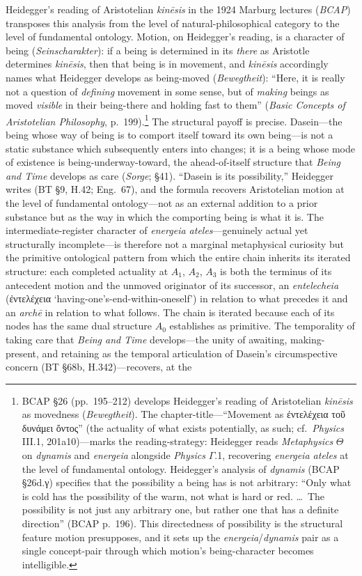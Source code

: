 \documentclass{article}
\newcommand{\gk}[1]{{\greekfont #1}}
\begin{document}
Heidegger's reading of Aristotelian \textit{kinēsis} in the 1924 Marburg lectures (\textit{BCAP}) transposes this analysis from the level of natural-philosophical category to the level of fundamental ontology. Motion, on Heidegger's reading, is a character of being (\textit{Seinscharakter}): if a being is determined in its \textit{there} as Aristotle determines \textit{kinēsis}, then that being is in movement, and \textit{kinēsis} accordingly names what Heidegger develops as being-moved (\textit{Bewegtheit}): ``Here, it is really not a question of \textit{defining} movement in some sense, but of \textit{making} beings as moved \textit{visible} in their being-there and holding fast to them'' (\textit{Basic Concepts of Aristotelian Philosophy}, p.~199).\footnote{BCAP §26 (pp.~195--212) develops Heidegger's reading of Aristotelian \textit{kinēsis} as movedness (\textit{Bewegtheit}). The chapter-title---``Movement as \gk{ἐντελέχεια τοῦ δυνάμει ὄντος}'' (the actuality of what exists potentially, as such; cf.~\textit{Physics} III.1, 201a10)---marks the reading-strategy: Heidegger reads \textit{Metaphysics} $\Theta$ on \textit{dynamis} and \textit{energeia} alongside \textit{Physics} $\Gamma$.1, recovering \textit{energeia ateles} at the level of fundamental ontology. Heidegger's analysis of \textit{dynamis} (BCAP §26d.γ) specifies that the possibility a being has is not arbitrary: ``Only what is cold has the possibility of the warm, not what is hard or red. \ldots\ The possibility is not just any arbitrary one, but rather one that has a definite direction'' (BCAP p.~196). This directedness of possibility is the structural feature motion presupposes, and it sets up the \textit{energeia}/\textit{dynamis} pair as a single concept-pair through which motion's being-character becomes intelligible.} The structural payoff is precise. Dasein---the being whose way of being is to comport itself toward its own being---is not a static substance which subsequently enters into changes; it is a being whose mode of existence is being-underway-toward, the ahead-of-itself structure that \textit{Being and Time} develops as care (\textit{Sorge}; \S 41). ``Dasein is its possibility,'' Heidegger writes (BT \S 9, H.42; Eng.~67), and the formula recovers Aristotelian motion at the level of fundamental ontology---not as an external addition to a prior substance but as the way in which the comporting being is what it is. The intermediate-register character of \textit{energeia ateles}---genuinely actual yet structurally incomplete---is therefore not a marginal metaphysical curiosity but the primitive ontological pattern from which the entire chain inherits its iterated structure: each completed actuality at $A_1$, $A_2$, $A_3$ is both the terminus of its antecedent motion and the unmoved originator of its successor, an \textit{entelecheia} (\gk{ἐντελέχεια} `having-one's-end-within-oneself') in relation to what precedes it and an \textit{archē} in relation to what follows. The chain is iterated because each of its nodes has the same dual structure $A_0$ establishes as primitive. The temporality of taking care that \textit{Being and Time} develops---the unity of awaiting, making-present, and retaining as the temporal articulation of Dasein's circumspective concern (BT \S 68b, H.342)---recovers, at the 
\end{document}
